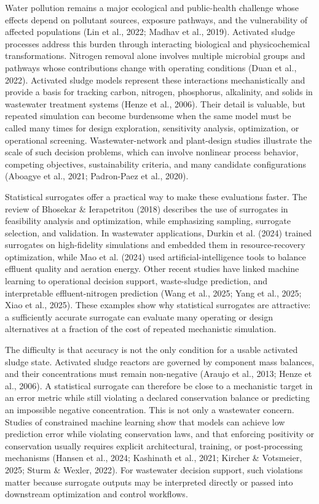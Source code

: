 \documentclass[a4paper,fleqn]{cas-sc}
\begin{document}
Water pollution remains a major ecological and public-health challenge whose effects depend on pollutant sources, exposure pathways, and the vulnerability of affected populations (Lin et al., 2022; Madhav et al., 2019). Activated sludge processes address this burden through interacting biological and physicochemical transformations. Nitrogen removal alone involves multiple microbial groups and pathways whose contributions change with operating conditions (Duan et al., 2022). Activated sludge models represent these interactions mechanistically and provide a basis for tracking carbon, nitrogen, phosphorus, alkalinity, and solids in wastewater treatment systems (Henze et al., 2006). Their detail is valuable, but repeated simulation can become burdensome when the same model must be called many times for design exploration, sensitivity analysis, optimization, or operational screening. Wastewater-network and plant-design studies illustrate the scale of such decision problems, which can involve nonlinear process behavior, competing objectives, sustainability criteria, and many candidate configurations (Aboagye et al., 2021; Padron-Paez et al., 2020).

Statistical surrogates offer a practical way to make these evaluations faster. The review of Bhosekar \& Ierapetritou (2018) describes the use of surrogates in feasibility analysis and optimization, while emphasizing sampling, surrogate selection, and validation. In wastewater applications, Durkin et al. (2024) trained surrogates on high-fidelity simulations and embedded them in resource-recovery optimization, while Mao et al. (2024) used artificial-intelligence tools to balance effluent quality and aeration energy. Other recent studies have linked machine learning to operational decision support, waste-sludge prediction, and interpretable effluent-nitrogen prediction (Wang et al., 2025; Yang et al., 2025; Xiao et al., 2025). These examples show why statistical surrogates are attractive: a sufficiently accurate surrogate can evaluate many operating or design alternatives at a fraction of the cost of repeated mechanistic simulation.

The difficulty is that accuracy is not the only condition for a usable activated sludge state. Activated sludge reactors are governed by component mass balances, and their concentrations must remain non-negative (Araujo et al., 2013; Henze et al., 2006). A statistical surrogate can therefore be close to a mechanistic target in an error metric while still violating a declared conservation balance or predicting an impossible negative concentration. This is not only a wastewater concern. Studies of constrained machine learning show that models can achieve low prediction error while violating conservation laws, and that enforcing positivity or conservation usually requires explicit architectural, training, or post-processing mechanisms (Hansen et al., 2024; Kashinath et al., 2021; Kircher \& Votsmeier, 2025; Sturm \& Wexler, 2022). For wastewater decision support, such violations matter because surrogate outputs may be interpreted directly or passed into downstream optimization and control workflows.
\end{document}
